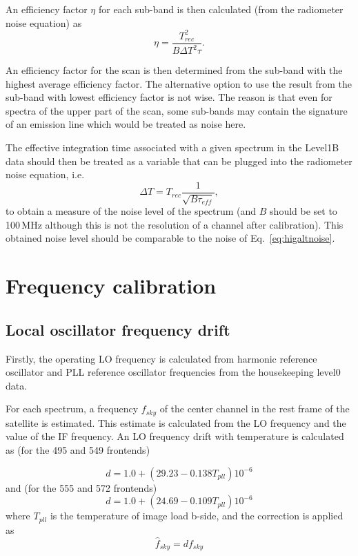 An efficiency factor \(\eta\) for each sub-band is then calculated (from the radiometer noise equation) as
\begin{equation}
\eta = \frac{T_{rec}^2}{B\Delta T^{2}\tau}.
\end{equation}

An efficiency factor for the scan is then determined from the sub-band
with the highest average efficiency factor. The alternative option
to use the result from the sub-band with lowest efficiency factor
is not wise. The reason is that even for spectra of the upper part
of the scan, some sub-bands may contain the signature of an emission 
line which would be treated as noise here.

The effective integration time associated with a given spectrum
in the Level1B data should then be treated as a 
variable that can be plugged into the radiometer noise equation,
i.e.
\begin{equation}
\Delta T = T_{rec}\frac{1}{\sqrt{B\tau_{eff}}},
\end{equation}
to obtain a measure of the noise level of the spectrum
(and \(B\) should be set to 100\,MHz although this is not
the resolution of a channel after calibration).
This obtained noise level should be comparable to the noise 
of Eq.~\ref{eq:higaltnoise}.


\section{Frequency calibration}

\subsection{Local oscillator frequency drift}

Firstly, the operating LO frequency is calculated
from harmonic reference oscillator and PLL reference oscillator 
frequencies from the housekeeping level0 data.

For each spectrum, a frequency \(f_{sky}\) of the center channel in 
the rest frame of the satellite is estimated.
This estimate is calculated from the LO frequency and the 
value of the IF frequency.
An LO frequency drift with temperature  
is calculated as (for the 495 and 549 frontends)

\begin{equation}
  d = 1.0+(29.23-0.138T_{pll})10^{-6}
\end{equation}
and (for the 555 and 572 frontends)
\begin{equation}
  d = 1.0+(24.69-0.109T_{pll})10^{-6}
\end{equation}
where \(T_{pll}\) is the temperature of image load b-side,
and the correction is applied as
\begin{equation}
 \hat{f}_{sky}= d f_{sky}
\end{equation}

